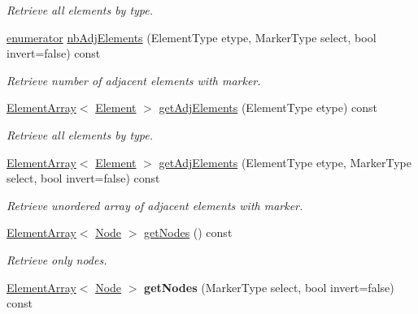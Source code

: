 \begin{DoxyCompactItemize}
\begin{DoxyCompactList}\small\item\em Retrieve all elements by type. \end{DoxyCompactList}\item 
\hyperlink{classINMOST_1_1Storage_ae333dfced6fa9cfde0c8e7dcf1b0cc2b}{enumerator} \hyperlink{classINMOST_1_1ElementSet_a4d3408a6908095a029584c24701e1144}{nb\-Adj\-Elements} (Element\-Type etype, Marker\-Type select, bool invert=false) const 
\begin{DoxyCompactList}\small\item\em Retrieve number of adjacent elements with marker. \end{DoxyCompactList}\item 
\hypertarget{classINMOST_1_1ElementSet_a7ade4a7bc7ac22b929738d7bf75e3144}{\hyperlink{classINMOST_1_1ElementArray}{Element\-Array}$<$ \hyperlink{classINMOST_1_1Element}{Element} $>$ \hyperlink{classINMOST_1_1ElementSet_a7ade4a7bc7ac22b929738d7bf75e3144}{get\-Adj\-Elements} (Element\-Type etype) const }\label{classINMOST_1_1ElementSet_a7ade4a7bc7ac22b929738d7bf75e3144}

\begin{DoxyCompactList}\small\item\em Retrieve all elements by type. \end{DoxyCompactList}\item 
\hyperlink{classINMOST_1_1ElementArray}{Element\-Array}$<$ \hyperlink{classINMOST_1_1Element}{Element} $>$ \hyperlink{classINMOST_1_1ElementSet_aec40c76a04a0180105fcdddedb31da63}{get\-Adj\-Elements} (Element\-Type etype, Marker\-Type select, bool invert=false) const 
\begin{DoxyCompactList}\small\item\em Retrieve unordered array of adjacent elements with marker. \end{DoxyCompactList}\item 
\hypertarget{classINMOST_1_1ElementSet_a189d152060b36e7800c08e7d0f94fdfa}{\hyperlink{classINMOST_1_1ElementArray}{Element\-Array}$<$ \hyperlink{classINMOST_1_1Node}{Node} $>$ \hyperlink{classINMOST_1_1ElementSet_a189d152060b36e7800c08e7d0f94fdfa}{get\-Nodes} () const }\label{classINMOST_1_1ElementSet_a189d152060b36e7800c08e7d0f94fdfa}

\begin{DoxyCompactList}\small\item\em Retrieve only nodes. \end{DoxyCompactList}\item 
\hypertarget{classINMOST_1_1ElementSet_ad87ceb890eaa093e45e13475fb33ffee}{\hyperlink{classINMOST_1_1ElementArray}{Element\-Array}$<$ \hyperlink{classINMOST_1_1Node}{Node} $>$ {\bfseries get\-Nodes} (Marker\-Type select, bool invert=false) const }\label{classINMOST_1_1ElementSet_ad87ceb890eaa093e45e13475fb33ffee}


\end{DoxyCompactItemize}
